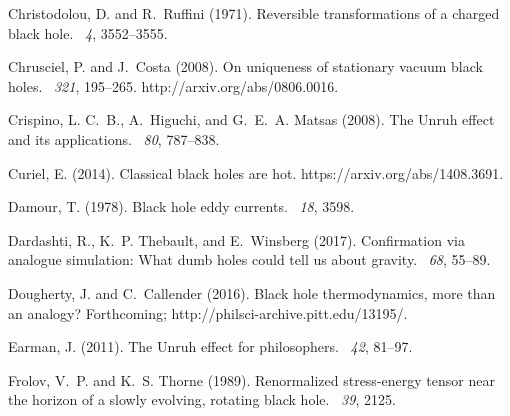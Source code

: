 \documentclass[12pt]{article}
\begin{document}
\begin{thebibliography}{}
Christodolou, D. and R.~Ruffini (1971).
\newblock Reversible transformations of a charged black hole.
~{\em 4}, 3552--3555.

Chrusciel, P. and J.~Costa (2008).
\newblock On uniqueness of stationary vacuum black holes.
~{\em 321}, 195--265.
\newblock http://arxiv.org/abs/0806.0016.

Crispino, L. C.~B., A.~Higuchi, and G.~E.~A. Matsas (2008).
\newblock The {U}nruh effect and its applications.
~{\em 80}, 787--838.

Curiel, E. (2014).
\newblock Classical black holes are hot.
\newblock https://arxiv.org/abs/1408.3691.

Damour, T. (1978).
\newblock Black hole eddy currents.
~{\em 18}, 3598.

Dardashti, R., K.~P. Thebault, and E.~Winsberg (2017).
\newblock Confirmation via analogue simulation: What dumb holes could tell us
  about gravity.
~{\em 68},
  55--89.

Dougherty, J. and C.~Callender (2016).
\newblock Black hole thermodynamics, more than an analogy?
\newblock Forthcoming; http://philsci-archive.pitt.edu/13195/.

Earman, J. (2011).
\newblock The {U}nruh effect for philosophers.
~{\em 42},
  81--97.

Frolov, V.~P. and K.~S. Thorne (1989).
\newblock Renormalized stress-energy tensor near the horizon of a slowly
  evolving, rotating black hole.
~{\em 39}, 2125.


\end{thebibliography}
\end{document}
